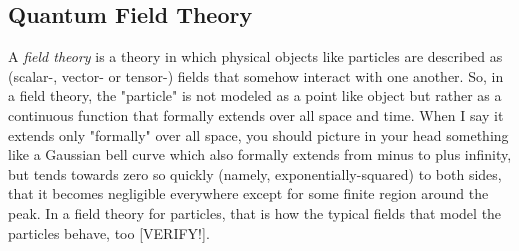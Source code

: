 

% 









\subsection{Quantum Field Theory}

A \emph{field theory} is a theory in which physical objects like particles are described as (scalar-, vector- or tensor-) fields that somehow interact with one another. So, in a field theory, the "particle" is not modeled as a point like object but rather as a continuous function that formally extends over all space and time. When I say it extends only "formally" over all space, you should picture in your head something like a Gaussian bell curve which also formally extends from minus to plus infinity, but tends towards zero so quickly (namely, exponentially-squared) to both sides, that it becomes negligible everywhere except for some finite region around the peak. In a field theory for particles, that is how the typical fields that model the particles behave, too [VERIFY!].

